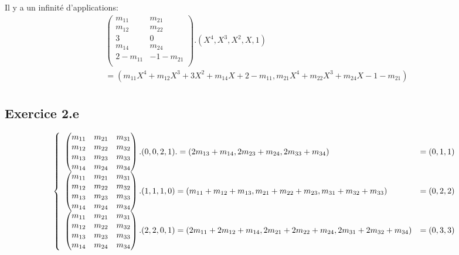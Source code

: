 \documentclass[]{book}
\theoremstyle{definition}
\begin{document}
Il y a un infinit\'e d'applications:
$$
\begin{array}{l}
\begin{pmatrix}
m_{11} & m_{21} \\
m_{12} & m_{22} \\
3 & 0 \\
m_{14} & m_{24} \\
2 - m_{11} & -1 - m_{21} \\
\end{pmatrix} . (X^4, X^3, X^2, X, 1) \\
= (m_{11}X^4+m_{12}X^3+3X^2+m_{14}X+2-m_{11}, m_{21}X^4+m_{22}X^3+m_{24}X - 1 - m_{21}) \\
\end{array}
$$

\subsection*{Exercice 2.e}
$$
\left\{
\begin{array}{l l}
\begin{pmatrix}
m_{11} & m_{21} & m_{31} \\
m_{12} & m_{22} & m_{32} \\
m_{13} & m_{23} & m_{33} \\
m_{14} & m_{24} & m_{34} \\
\end{pmatrix} 
. (0, 0, 2, 1) . 
= (2m_{13} + m_{14}, 2m_{23} + m_{24}, 2m_{33} + m_{34})
& = (0, 1, 1) \\

\begin{pmatrix}
m_{11} & m_{21} & m_{31} \\
m_{12} & m_{22} & m_{32} \\
m_{13} & m_{23} & m_{33} \\
m_{14} & m_{24} & m_{34} \\
\end{pmatrix} . (1, 1, 1, 0) 
= (m_{11}+m_{12}+m_{13}, m_{21}+m_{22}+m_{23},m_{31}+m_{32}+m_{33})
& = (0, 2, 2) \\

\begin{pmatrix}
m_{11} & m_{21} & m_{31} \\
m_{12} & m_{22} & m_{32} \\
m_{13} & m_{23} & m_{33} \\
m_{14} & m_{24} & m_{34} \\
\end{pmatrix} . (2, 2, 0, 1)
= (2m_{11}+2m_{12}+m_{14}, 2m_{21}+2m_{22}+m_{24}, 2m_{31}+2m_{32}+m_{34})
& = (0, 3, 3) \\
\end{array}
\right.
$$
\end{document}
